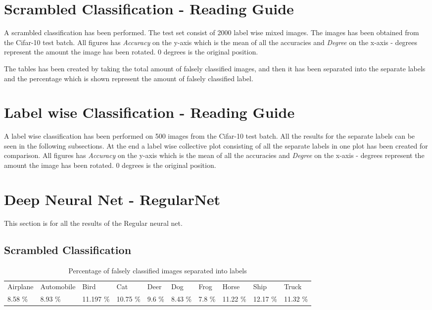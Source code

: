 \section{Scrambled Classification - Reading Guide}
A scrambled classification has been performed. The test set consist of 2000 label wise mixed images. The images has been obtained from the Cifar-10 test batch.
All figures has \emph{Accuracy} on the y-axis which is the mean of all the accuracies and \emph{Degree} on the x-axis - degrees represent the amount the image has been rotated. 0 degrees is the original position.

The tables has been created by taking the total amount of falsely classified images, and then it has been separated into the separate labels and the percentage which is shown represent the amount of falsely classified label.

\section{Label wise Classification - Reading Guide}
A label wise classification has been performed on 500 images from the Cifar-10 test batch. All the results for the separate labels can be seen in the following subsections. At the end a label wise collective plot consisting of all the separate labels in one plot has been created for comparison.
All figures has \emph{Accuracy} on the y-axis which is the mean of all the accuracies and \emph{Degree} on the x-axis - degrees represent the amount the image has been rotated. 0 degrees is the original position.

\section{Deep Neural Net - RegularNet}
This section is for all the results of the Regular neural net.
\subsection{Scrambled Classification}
\FloatBarrier

\begin{table}[]
	\centering
	\caption{Percentage of falsely classified images separated into labels }
	\label{table:falseclasReg}
	\begin{tabular}{llllllllll}
		Airplane & Automobile & Bird     & Cat    & Deer     & Dog     & Frog   & Horse    & Ship         & Truck         \\
		8.58 \%  & 8.93 \%    & 11.197 \% & 10.75 \% & 9.6 \% & 8.43 \% & 7.8 \% & 11.22 \% & 12.17 \% & 11.32 \%
	\end{tabular}
\end{table}
\FloatBarrier
